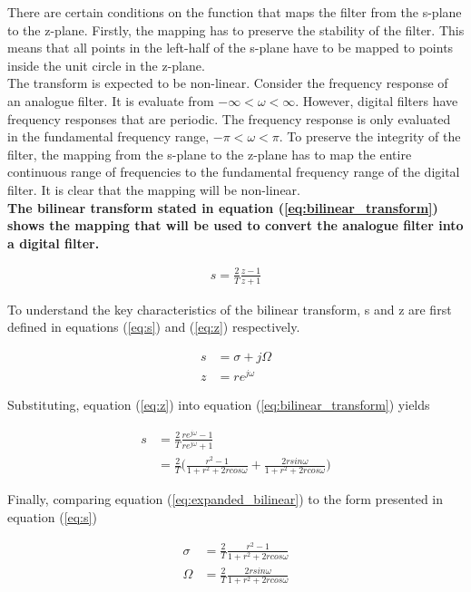 \documentclass{article}
\begin{document}
There are certain conditions on the function that maps the filter from the s-plane to the z-plane. Firstly, the mapping has to preserve the stability of the filter. This means that all points in the left-half of the s-plane have to be mapped to points inside the unit circle in the z-plane. \\

The transform is expected to be non-linear. Consider the frequency response of an analogue filter. It is evaluate from $-\infty < \omega < \infty$. However, digital filters have frequency responses that are periodic. The frequency response is only evaluated in the fundamental frequency range, $-\pi < \omega < \pi$. To preserve the integrity of the filter, the mapping from the s-plane to the z-plane has to map the entire continuous range of frequencies to the fundamental frequency range of the digital filter. It is clear that the mapping will be non-linear.\\

\textbf{The bilinear transform stated in equation (\ref{eq:bilinear_transform}) shows the mapping that will be used to convert the analogue filter into a digital filter.}

\begin{align}\label{eq:bilinear_transform}
    s = \frac{2}{T}\frac{z-1}{z+1}
\end{align}

To understand the key characteristics of the bilinear transform, s and z are first defined in equations (\ref{eq:s}) and (\ref{eq:z}) respectively. 

\begin{align}
    s &= \sigma + j\Omega \label{eq:s}\\
    z &= re^{j\omega}\label{eq:z}
\end{align}

Substituting, equation (\ref{eq:z}) into equation (\ref{eq:bilinear_transform}) yields

\begin{align}
    s &= \frac{2}{T}\frac{re^{j\omega}-1}{re^{j\omega}+1} \nonumber \\
      &= \frac{2}{T}\Big(\frac{r^2 - 1}{1+r^2+2rcos\omega}+\frac{2rsin\omega}{1+r^2+2rcos\omega}\Big)\label{eq:expanded_bilinear}
\end{align}

Finally, comparing equation (\ref{eq:expanded_bilinear}) to the form presented in equation (\ref{eq:s})

\begin{align}
    \sigma &= \frac{2}{T}\frac{r^2- 1}{1+r^2+2rcos\omega}\label{eq:sigma}\\
    \Omega &= \frac{2}{T}\frac{2rsin\omega}{1+r^2+2rcos\omega}
\end{align}
\end{document}
